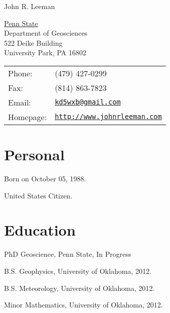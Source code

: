 \documentclass[letterpaper]{article}
\def\name{John R. Leeman}
\renewenvironment{itemize}{
  \begin{list}{}{
    \setlength{\leftmargin}{1.5em}
  }
}{
  \end{list}
}
\begin{document}
{\huge \name}


\vspace{0.25in}

\begin{minipage}{0.45\linewidth}
  \href{http://www.geosc.psu.edu/}{Penn State } \\
  Department of Geosciences \\
  522 Deike Building \\
   University Park, PA  16802
\end{minipage}
\begin{minipage}{0.45\linewidth}
  \begin{tabular}{ll}
    Phone: & (479) 427-0299 \\
    Fax: &  (814) 863-7823 \\
    Email: & \href{mailto:kd5wxb@gmail.com}{\tt kd5wxb@gmail.com} \\
    Homepage: & \href{http://www.johnrleeman.com}{\tt http://www.johnrleeman.com} \\
  \end{tabular}
\end{minipage}


\section*{Personal}

\begin{itemize}
\item Born on October 05, 1988.
\item United States Citizen.
\end{itemize}


\section*{Education}

\begin{itemize}
 \item PhD Geoscience, Penn State, In Progress

 \item B.S. Geophysics, University of Oklahoma, 2012.

  \item B.S. Meteorology, University of Oklahoma, 2012.

 \item Minor Mathematics, University of Oklahoma, 2012.
\end{itemize}
\end{document}
